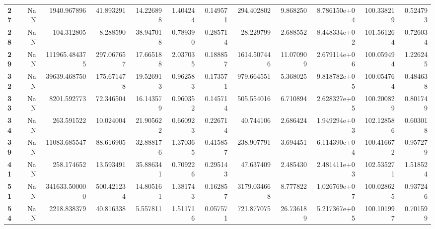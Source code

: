 \begin{table}[h]
\begin{tabular}{lrrrrrrrrrrr}
\textbf{27} &       NaN &    1940.967896 &       41.893291 &                  14.226898 &  1.404244 &  0.149571 &   294.402802 &   9.868250 &  8.786150e+04 &  100.338219 &     0.524793 \\
\textbf{28} &       NaN &     104.312805 &        8.288590 &                  38.947018 &  0.789390 &  0.285714 &    28.229799 &   2.688552 &  8.448334e+02 &  101.561264 &     0.726034 \\
\textbf{29} &       NaN &  111965.484375 &      297.067657 &                  17.665188 &  2.037035 &  0.188857 &  1614.507446 &  11.070909 &  2.679114e+06 &  100.059494 &     1.226245 \\
\textbf{32} &       NaN &   39639.468750 &      175.671478 &                  19.526913 &  0.962583 &  0.173571 &   979.664551 &   5.368025 &  9.818782e+05 &  100.054764 &     0.484638 \\
\textbf{33} &       NaN &    8201.592773 &       72.346504 &                  16.143579 &  0.960352 &  0.145714 &   505.554016 &   6.710894 &  2.628327e+05 &  100.200829 &     0.801749 \\
\textbf{34} &       NaN &     263.591522 &       10.024004 &                  21.905622 &  0.660923 &  0.226714 &    40.744106 &   2.686424 &  1.949294e+03 &  102.128586 &     0.603018 \\
\textbf{39} &       NaN &   11083.685547 &       88.616905 &                  32.888176 &  1.370365 &  0.415857 &   238.907791 &   3.694451 &  6.114390e+04 &  100.416672 &     0.957279 \\
\textbf{41} &       NaN &     258.174652 &       13.593491 &                  35.886341 &  0.709226 &  0.295143 &    47.637409 &   2.485430 &  2.481411e+03 &  102.535271 &     1.518524 \\
\textbf{51} &       NaN &  341633.500000 &      500.421234 &                  14.805161 &  1.381743 &  0.162857 &  3179.034668 &   8.777822 &  1.026769e+07 &  100.028625 &     0.937246 \\
\textbf{54} &       NaN &    2218.838379 &       40.816338 &                   5.557811 &  1.511716 &  0.057571 &   721.877075 &  26.736189 &  5.217367e+05 &  100.101997 &     0.701599 \\
\bottomrule
\end{tabular}
\end{table}
